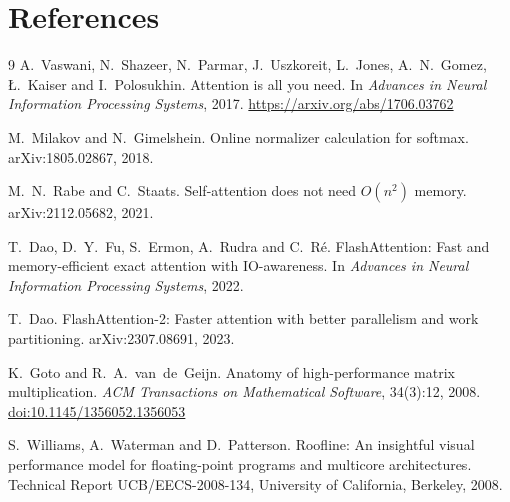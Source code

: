 \documentclass[11pt,a4paper]{article}
\begin{document}
\section*{References}
\begingroup
\renewcommand{\section}[2]{}
\begin{thebibliography}{9}
A.~Vaswani, N.~Shazeer, N.~Parmar, J.~Uszkoreit, L.~Jones, A.~N.~Gomez,
\L.~Kaiser and I.~Polosukhin.
\newblock Attention is all you need.
\newblock In \emph{Advances in Neural Information Processing Systems}, 2017.
\newblock \url{https://arxiv.org/abs/1706.03762}

M.~Milakov and N.~Gimelshein.
\newblock Online normalizer calculation for softmax.
\newblock arXiv:1805.02867, 2018.

M.~N.~Rabe and C.~Staats.
\newblock Self-attention does not need $O(n^2)$ memory.
\newblock arXiv:2112.05682, 2021.

T.~Dao, D.~Y.~Fu, S.~Ermon, A.~Rudra and C.~R\'e.
\newblock FlashAttention: Fast and memory-efficient exact attention with
IO-awareness.
\newblock In \emph{Advances in Neural Information Processing Systems}, 2022.

T.~Dao.
\newblock FlashAttention-2: Faster attention with better parallelism and work
partitioning.
\newblock arXiv:2307.08691, 2023.

K.~Goto and R.~A.~van~de~Geijn.
\newblock Anatomy of high-performance matrix multiplication.
\newblock \emph{ACM Transactions on Mathematical Software}, 34(3):12, 2008.
\newblock \href{https://doi.org/10.1145/1356052.1356053}{doi:10.1145/1356052.1356053}

S.~Williams, A.~Waterman and D.~Patterson.
\newblock Roofline: An insightful visual performance model for floating-point
programs and multicore architectures.
\newblock Technical Report UCB/EECS-2008-134, University of California,
Berkeley, 2008.
\end{thebibliography}
\endgroup
\end{document}
